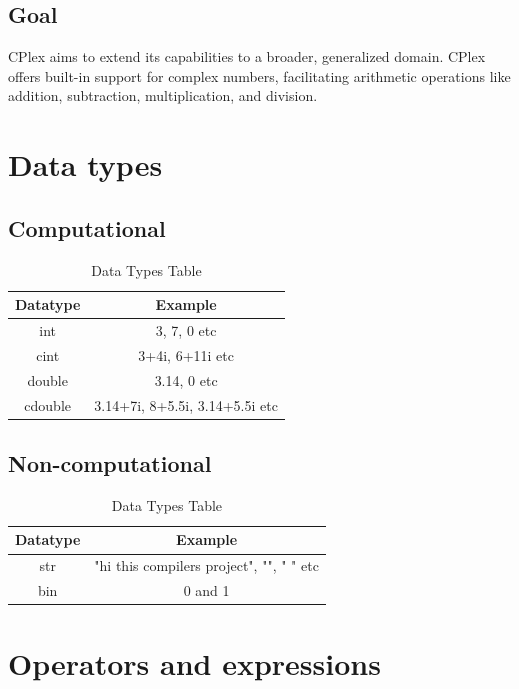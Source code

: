 \documentclass[12pt]{article}
\begin{document}
\subsection{Goal}
CPlex aims to extend its capabilities to a broader, generalized domain. CPlex offers built-in support for complex numbers, facilitating arithmetic operations like addition, subtraction, multiplication, and division. 
\section{Data types}

\subsection{Computational}
\begin{table}[ht]
\centering
\renewcommand{\arraystretch}{1.5} %
\setlength{\tabcolsep}{30pt} %
\begin{tabular}{|c|c|}
\hline
\bfseries Datatype & \bfseries Example \\
\hline
int &  3, 7, 0 etc\\
\hline
cint &  3+4i, 6+11i etc\\
\hline
double &  3.14, 0 etc \\
\hline
cdouble &   3.14+7i, 8+5.5i, 3.14+5.5i etc\\

\hline
\end{tabular}
\caption{Data Types Table}
\end{table}
\subsection{Non-computational}

\begin{table}[ht]
\centering
\renewcommand{\arraystretch}{1.5} %
\setlength{\tabcolsep}{30pt} %
\begin{tabular}{|c|c|}
\hline
\bfseries Datatype & \bfseries Example \\
\hline

\hline
str &  "hi this compilers project", "", " " etc\\
\hline
bin &  0 and 1\\
\hline
\end{tabular}
\caption{Data Types Table}
\end{table}

\section{Operators and expressions}
\end{document}
